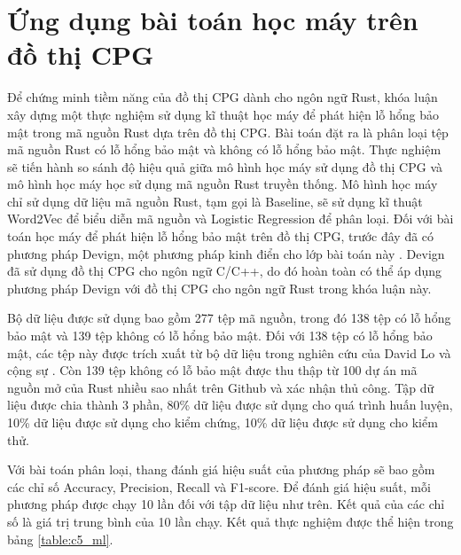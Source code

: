 \section{Ứng dụng bài toán học máy trên đồ thị CPG}


Để chứng minh tiềm năng của đồ thị CPG dành cho ngôn ngữ Rust, khóa luận xây dựng một thực nghiệm sử dụng kĩ thuật học máy để phát hiện lỗ hổng bảo mật trong mã nguồn Rust dựa trên đồ thị CPG.
Bài toán đặt ra là phân loại tệp mã nguồn Rust có lỗ hổng bảo mật và không có lỗ hổng bảo mật.
Thực nghiệm sẽ tiến hành so sánh độ hiệu quả giữa mô hình học máy sử dụng đồ thị CPG và mô hình học máy học sử dụng mã nguồn Rust truyền thống.
Mô hình học máy chỉ sử dụng dữ liệu mã nguồn Rust, tạm gọi là Baseline, sẽ sử dụng kĩ thuật Word2Vec \cite{church2017word2vec} để biểu diễn mã nguồn và Logistic Regression \cite{lavalley2008logistic} để phân loại.
Đối với bài toán học máy để phát hiện lỗ hổng bảo mật trên đồ thị CPG, trước đây đã có phương pháp Devign, một phương pháp kinh điển cho lớp bài toán này \cite{zhou2019devign}.
Devign đã sử dụng đồ thị CPG cho ngôn ngữ C/C++, do đó hoàn toàn có thể áp dụng phương pháp Devign với đồ thị CPG cho ngôn ngữ Rust trong khóa luận này.

Bộ dữ liệu được sử dụng bao gồm 277 tệp mã nguồn, trong đó 138 tệp có lỗ hổng bảo mật và 139 tệp không có lỗ hổng bảo mật.
Đối với 138 tệp có lỗ hổng bảo mật, các tệp này được trích xuất từ bộ dữ liệu trong nghiên cứu của David Lo và cộng sự \cite{zheng2023closer}.
Còn 139 tệp không có lỗ bảo mật được thu thập từ 100 dự án mã nguồn mở của Rust nhiều sao nhất trên Github \cite{githubGithubRankingTop100RustmdMaster} và xác nhận thủ công.
Tập dữ liệu được chia thành 3 phần, 80\% dữ liệu được sử dụng cho quá trình huấn luyện, 10\% dữ liệu được sử dụng cho kiểm chứng, 10\% dữ liệu được sử dụng cho kiểm thử.

Với bài toán phân loại, thang đánh giá hiệu suất của phương pháp sẽ bao gồm các chỉ số Accuracy, Precision, Recall và F1-score.
Để đánh giá hiệu suất, mỗi phương pháp được chạy 10 lần đối với tập dữ liệu như trên.
Kết quả của các chỉ số là giá trị trung bình của 10 lần chạy.
Kết quả thực nghiệm được thể hiện trong bảng \ref{table:c5_ml}.

